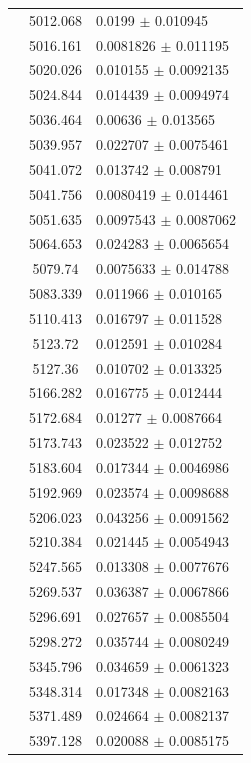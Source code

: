 \begin{longtable}{|c|c|l|}
 & 5012.068 & 0.0199 $\pm$ 0.010945 \\          
 & 5016.161 & 0.0081826 $\pm$ 0.011195 \\       
 & 5020.026 & 0.010155 $\pm$ 0.0092135 \\       
 & 5024.844 & 0.014439 $\pm$ 0.0094974 \\       
 & 5036.464 & 0.00636 $\pm$ 0.013565 \\         
 & 5039.957 & 0.022707 $\pm$ 0.0075461 \\       
 & 5041.072 & 0.013742 $\pm$ 0.008791 \\        
 & 5041.756 & 0.0080419 $\pm$ 0.014461 \\       
 & 5051.635 & 0.0097543 $\pm$ 0.0087062 \\      
 & 5064.653 & 0.024283 $\pm$ 0.0065654 \\       
 & 5079.74 & 0.0075633 $\pm$ 0.014788 \\        
 & 5083.339 & 0.011966 $\pm$ 0.010165 \\        
 & 5110.413 & 0.016797 $\pm$ 0.011528 \\        
 & 5123.72 & 0.012591 $\pm$ 0.010284 \\         
 & 5127.36 & 0.010702 $\pm$ 0.013325 \\         
 & 5166.282 & 0.016775 $\pm$ 0.012444 \\        
 & 5172.684 & 0.01277 $\pm$ 0.0087664 \\        
 & 5173.743 & 0.023522 $\pm$ 0.012752 \\        
 & 5183.604 & 0.017344 $\pm$ 0.0046986 \\       
 & 5192.969 & 0.023574 $\pm$ 0.0098688 \\       
 & 5206.023 & 0.043256 $\pm$ 0.0091562 \\       
 & 5210.384 & 0.021445 $\pm$ 0.0054943 \\       
 & 5247.565 & 0.013308 $\pm$ 0.0077676 \\       
 & 5269.537 & 0.036387 $\pm$ 0.0067866 \\       
 & 5296.691 & 0.027657 $\pm$ 0.0085504 \\       
 & 5298.272 & 0.035744 $\pm$ 0.0080249 \\       
 & 5345.796 & 0.034659 $\pm$ 0.0061323 \\       
 & 5348.314 & 0.017348 $\pm$ 0.0082163 \\       
 & 5371.489 & 0.024664 $\pm$ 0.0082137 \\       
 & 5397.128 & 0.020088 $\pm$ 0.0085175 \\       

\end{longtable}
